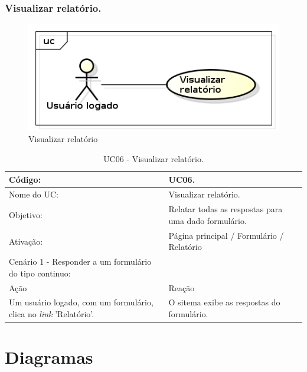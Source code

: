 \documentclass[11pt]{article}
\begin{document}
    \clearpage
      
      \subsubsection{Visualizar relatório.}

        \begin{figure}[h!]
          \centering
          \includegraphics[width=.5\textwidth]{visualizar.png}
          \caption{Visualizar relatório}
        \end{figure}

        \begin{table}[h]
          \begin{center}
            \begin{tabular}{ | p{7cm} | p{8cm} | }
              \hline
              Código: \cellcolor{gray} & UC06. \\
              \hline
              Nome do UC: \cellcolor{gray} & Visualizar relatório. \\
              \hline
              Objetivo: \cellcolor{gray} & Relatar todas as respostas para uma dado formulário. \\
              \hline
              Ativação: \cellcolor{gray} & Página principal / Formulário / Relatório \\
              \hline
              \hline
              Cenário 1 - Responder a um formulário do tipo continuo: &  \\
              \hline
              Ação\cellcolor{gray} & Reação\cellcolor{gray} \\
              \hline
              Um usuário logado, com um formulário, clica no {\em link} 'Relatório'. & O sitema exibe as respostas do formulário. \\
              \hline
            \end{tabular}
            \caption{UC06 - Visualizar relatório.}
          \end{center}
        \end{table}
        
  \clearpage
      
  \section{Diagramas}
  
\end{document}
